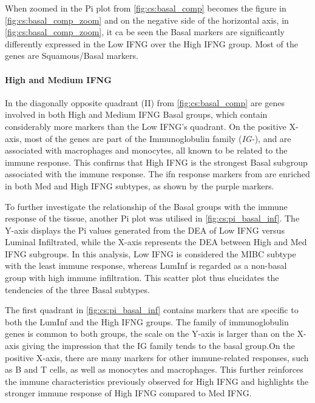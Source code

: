 When zoomed in the Pi plot from \cref{fig:cs:basal_comp} becomes the figure in \cref{fig:cs:basal_comp_zoom} and on the negative side of the horizontal axis, in \cref{fig:cs:basal_comp_zoom}, it ca be seen the Basal markers are significantly differently expressed in the Low IFNG over the High IFNG group. Most of the genes are Squamous/Basal markers.

\paragraph*{High and Medium IFNG}

In the diagonally opposite quadrant (II) from \cref{fig:cs:basal_comp} are genes involved in both High and Medium IFNG Basal groups, which contain considerably more markers than the Low IFNG's quadrant. On the positive X-axis, most of the genes are part of the Immunoglobulin family (\textit{IG-}), and are associated with macrophages and monocytes, all known to be related to the immune response. This confirms that High IFNG is the strongest Basal subgroup associated with the immune response. The \acrshort{ifn} response markers from \citet{Baker2022-bj} are enriched in both Med and High IFNG subtypes, as shown by the purple markers.


To further investigate the relationship of the Basal groups with the immune response of the tissue, another Pi plot was utilised in \cref{fig:cs:pi_basal_inf}. The Y-axis displays the Pi values generated from the DEA of Low IFNG versus Luminal Infiltrated, while the X-axis represents the DEA between High and Med IFNG subgroups. In this analysis, Low IFNG is considered the MIBC subtype with the least immune response, whereas LumInf is regarded as a non-basal group with high immune infiltration. This scatter plot thus elucidates the tendencies of the three Basal subtypes.

The first quadrant in \cref{fig:cs:pi_basal_inf} contains markers that are specific to both the LumInf and the High IFNG groups. The family of immunoglobulin genes is common to both groups, the scale on the Y-axis is larger than on the X-axis giving the impression that the IG family tends to the basal group.On the positive X-axis, there are many markers for other immune-related responses, such as B and T cells, as well as monocytes and macrophages. This further reinforces the immune characteristics previously observed for High IFNG and highlights the stronger immune response of High IFNG compared to Med IFNG.


